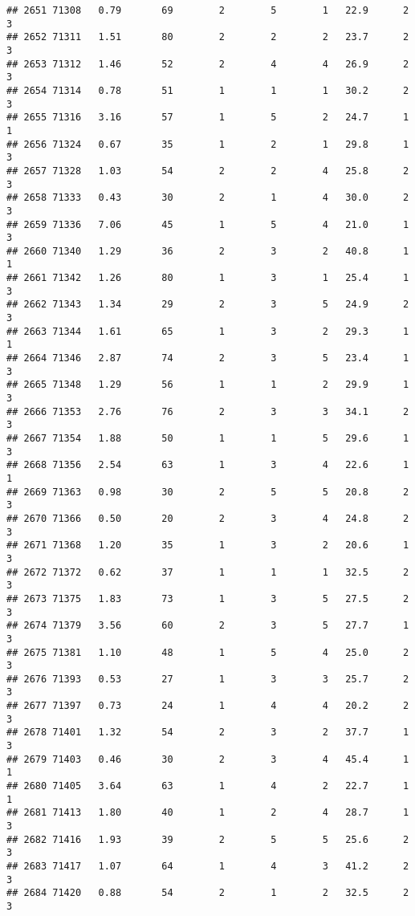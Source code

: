 \documentclass[
]{article}
\begin{document}
\begin{verbatim}
## 2651 71308   0.79       69        2        5        1   22.9      2      3
## 2652 71311   1.51       80        2        2        2   23.7      2      3
## 2653 71312   1.46       52        2        4        4   26.9      2      3
## 2654 71314   0.78       51        1        1        1   30.2      2      3
## 2655 71316   3.16       57        1        5        2   24.7      1      1
## 2656 71324   0.67       35        1        2        1   29.8      1      3
## 2657 71328   1.03       54        2        2        4   25.8      2      3
## 2658 71333   0.43       30        2        1        4   30.0      2      3
## 2659 71336   7.06       45        1        5        4   21.0      1      3
## 2660 71340   1.29       36        2        3        2   40.8      1      1
## 2661 71342   1.26       80        1        3        1   25.4      1      3
## 2662 71343   1.34       29        2        3        5   24.9      2      3
## 2663 71344   1.61       65        1        3        2   29.3      1      1
## 2664 71346   2.87       74        2        3        5   23.4      1      3
## 2665 71348   1.29       56        1        1        2   29.9      1      3
## 2666 71353   2.76       76        2        3        3   34.1      2      3
## 2667 71354   1.88       50        1        1        5   29.6      1      3
## 2668 71356   2.54       63        1        3        4   22.6      1      1
## 2669 71363   0.98       30        2        5        5   20.8      2      3
## 2670 71366   0.50       20        2        3        4   24.8      2      3
## 2671 71368   1.20       35        1        3        2   20.6      1      3
## 2672 71372   0.62       37        1        1        1   32.5      2      3
## 2673 71375   1.83       73        1        3        5   27.5      2      3
## 2674 71379   3.56       60        2        3        5   27.7      1      3
## 2675 71381   1.10       48        1        5        4   25.0      2      3
## 2676 71393   0.53       27        1        3        3   25.7      2      3
## 2677 71397   0.73       24        1        4        4   20.2      2      3
## 2678 71401   1.32       54        2        3        2   37.7      1      3
## 2679 71403   0.46       30        2        3        4   45.4      1      1
## 2680 71405   3.64       63        1        4        2   22.7      1      1
## 2681 71413   1.80       40        1        2        4   28.7      1      3
## 2682 71416   1.93       39        2        5        5   25.6      2      3
## 2683 71417   1.07       64        1        4        3   41.2      2      3
## 2684 71420   0.88       54        2        1        2   32.5      2      3

\end{verbatim}
\end{document}
